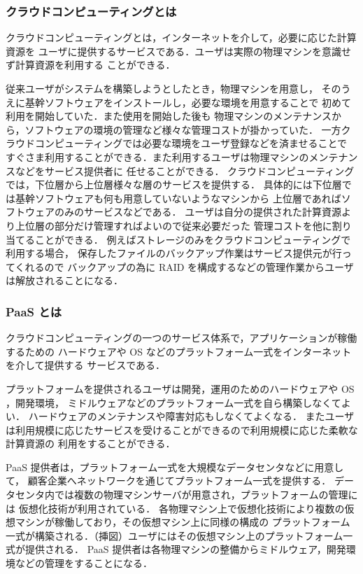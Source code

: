 \documentclass[graduation-thesis]{mlarticle}
\begin{document}
\subsubsection{クラウドコンピューティングとは}
\label{sec-2-2-1}
クラウドコンピューティングとは，インターネットを介して，必要に応じた計算資源を
ユーザに提供するサービスである．ユーザは実際の物理マシンを意識せず計算資源を利用する
ことができる．

従来ユーザがシステムを構築しようとしたとき，物理マシンを用意し，
そのうえに基幹ソフトウェアをインストールし，必要な環境を用意することで
初めて利用を開始していた．また使用を開始した後も
物理マシンのメンテナンスから，ソフトウェアの環境の管理など様々な管理コストが掛かっていた．
一方クラウドコンピューティングでは必要な環境をユーザ登録などを済ませることで
すぐさま利用することができる．また利用するユーザは物理マシンのメンテナンスなどをサービス提供者に
任せることができる．
クラウドコンピューティングでは，下位層から上位層様々な層のサービスを提供する．
具体的には下位層では基幹ソフトウェアも何も用意していないようなマシンから
上位層であればソフトウェアのみのサービスなどである．
ユーザは自分の提供された計算資源より上位層の部分だけ管理すればよいので従来必要だった
管理コストを他に割り当てることができる．
例えばストレージのみをクラウドコンピューティングで利用する場合，
保存したファイルのバックアップ作業はサービス提供元が行ってくれるので
バックアップの為に RAID を構成するなどの管理作業からユーザは解放されることになる．

\subsubsection{PaaS とは}
\label{sec-2-2-2}
クラウドコンピューティングの一つのサービス体系で，アプリケーションが稼働するための
ハードウェアや OS などのプラットフォーム一式をインターネットを介して提供する
サービスである．

プラットフォームを提供されるユーザは開発，運用のためのハードウェアや OS ，開発環境，
ミドルウェアなどのプラットフォーム一式を自ら構築しなくてよい．
ハードウェアのメンテナンスや障害対応もしなくてよくなる．
またユーザは利用規模に応じたサービスを受けることができるので利用規模に応じた柔軟な計算資源の
利用をすることができる．

PaaS 提供者は，プラットフォーム一式を大規模なデータセンタなどに用意して，
顧客企業へネットワークを通じてプラットフォーム一式を提供する．
データセンタ内では複数の物理マシンサーバが用意され，プラットフォームの管理には
仮想化技術が利用されている．
各物理マシン上で仮想化技術により複数の仮想マシンが稼働しており，その仮想マシン上に同様の構成の
プラットフォーム一式が構築される．（挿図）ユーザにはその仮想マシン上のプラットフォーム一式が提供される．
PaaS 提供者は各物理マシンの整備からミドルウェア，開発環境などの管理をすることになる．
\end{document}
